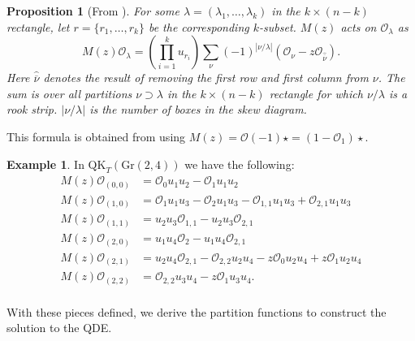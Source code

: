 \documentclass[12pt]{article}
\newtheorem{proposition}[theorem]{Proposition}
\newcommand{\OC}{\mathcal{O}}
\theoremstyle{plain}
\theoremstyle{definition}
\newtheorem{example}[theorem]{Example}
\begin{document}
\begin{proposition}[From \cite{Buch_2011}]\label{kpieri}
For some $\lambda=(\lambda_1,\dots, \lambda_k)$ in the $k\times (n-k)$ rectangle, let $r=\{r_1,\dots,r_k\}$ be the corresponding $k$-subset. $M(z)$ acts on $\OC_\lambda$ as
\begin{equation}  
M(z) \mathcal{O}_{\lambda} = \left(\prod_{i=1} ^k {u_{r_i}} \right) \sum_{\nu} (-1)^{|\nu/\lambda|} \left(\mathcal{O}_{\nu}-z\mathcal{O}_{\hat{\overline{\nu}}} \right). 
\end{equation}
Here $\hat{\overline{\nu}}$ denotes the result of removing the first row and first column from $\nu$. The sum is over all partitions $\nu \supset \lambda$ in the $k\times (n-k)$ rectangle for which $\nu / \lambda$ is a rook strip. 
$|\nu / \lambda |$ is the number of boxes in the skew diagram.
\end{proposition}
 This formula is obtained from using $M(z)=\OC(-1)\star =(1-\OC_{1})\star$.
\begin{example}
 In $\textrm{QK}_T(\textrm{Gr}(2,4))$ we have the following:
\begin{align*}
    M(z)\OC_{(0,0)} &= \OC_{{0}}u_{{1}}u_{{2}}-\OC_{{1}}u_{{1}}u_{{2}} \\
    M(z)\OC_{(1,0)} &= \OC_{{1}}u_{{1}}u_{{3}}-\OC_{{2}}u_{{1}}u_{{3}}-\OC_{{1,1}}u_{{1}}u_{{3}}+\OC_
{{2,1}}u_{{1}}u_{{3}}
 \\
    M(z)\OC_{(1,1)} &= u_{{2}}u_{{3}}\OC_{{1,1}}-u_{{2}}u_{{3}}\OC_{{2,1}}\\
    M(z)\OC_{(2,0)} &= u_{{1}}u_{{4}}\OC_{{2}}-u_{{1}}u_{{4}}\OC_{{2,1}} \\
    M(z)\OC_{(2,1)} &= u_{{2}}u_{{4}}\OC_{{2,1}}-
\OC_{{2,2}}u_{{2}}u_{{4}}-z\OC_{{0}}u_{{2}}u_{{4}}+z\OC_{{1}}u_{{2}}u_{{4}}
 \\
    M(z)\OC_{(2,2)} &= \OC_{{2,2}}u_{{3}}u_{{4}} -z\OC_{{1}}u_{{3}}u_{{4}}.\\
\end{align*}
\end{example}


With these pieces defined, we derive the partition functions to construct the solution to the QDE.
\end{document}
